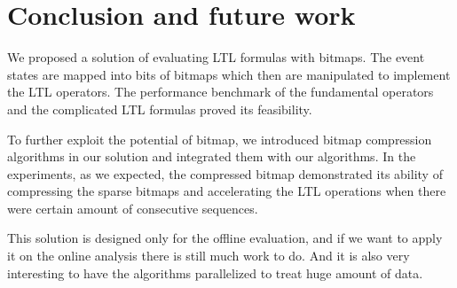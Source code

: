 

\section{Conclusion and future work}\label{sec:conclusion} %

We proposed a solution of evaluating LTL formulas with bitmaps. The event states are mapped into bits of bitmaps which then are manipulated to implement the LTL operators. The performance benchmark of the fundamental operators and the complicated LTL formulas proved its feasibility.

To further exploit the potential of bitmap, we introduced bitmap compression algorithms in our solution and integrated them with our algorithms. In the experiments, as we expected, the compressed bitmap demonstrated its ability of compressing the sparse bitmaps and accelerating the LTL operations when there were certain amount of consecutive sequences.

This solution is designed only for the offline evaluation, and if we want to apply it on the online analysis there is still much work to do. And it is also very interesting to have the algorithms parallelized to treat huge amount of data.

